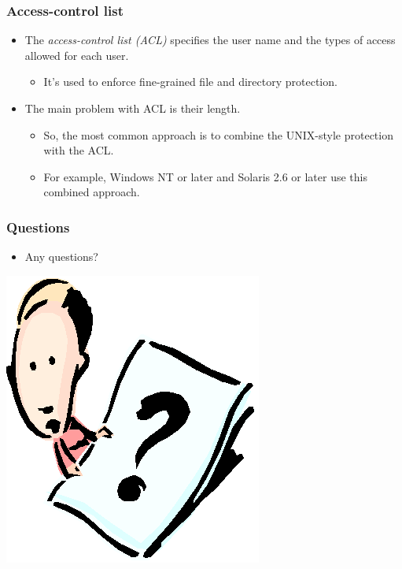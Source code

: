 \documentclass[CJKutf8,xcolor=pdftex,dvipsnames,table]{beamer}
\begin{document}
\begin{CJK*}{UTF8}{song}
  \begin{frame}
    \frametitle{Access-control list} \pause
    \begin{itemize}
    \item The \emph{access-control list (ACL)} specifies the user name and the types of access allowed for each user. \pause
      \begin{itemize}
      \item It's used to enforce fine-grained file and directory protection. \pause
      \end{itemize}
    \item The main problem with ACL is their length. \pause
      \begin{itemize}
      \item So, the most common approach is to combine the UNIX-style protection with the ACL. \pause
      \item For example, Windows NT or later and Solaris 2.6 or later use this combined approach.
      \end{itemize}
    \end{itemize}
  \end{frame}
  
  \begin{frame}
    \frametitle{Questions}
    \begin{itemize}
    \item Any questions?
    \end{itemize}
    \begin{center}
      \includegraphics[scale=.5]{question}
    \end{center}
  \end{frame}
  

\end{CJK*}
\end{document}

